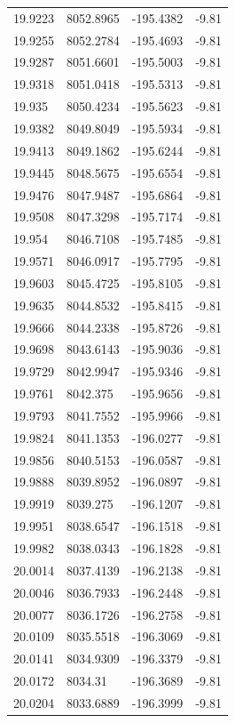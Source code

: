 \begin{table}[H]
\begin{tabular}{llll}
19.9223 & 8052.8965 & -195.4382 & -9.81 \\
19.9255 & 8052.2784 & -195.4693 & -9.81 \\
19.9287 & 8051.6601 & -195.5003 & -9.81 \\
19.9318 & 8051.0418 & -195.5313 & -9.81 \\
19.935 & 8050.4234 & -195.5623 & -9.81 \\
19.9382 & 8049.8049 & -195.5934 & -9.81 \\
19.9413 & 8049.1862 & -195.6244 & -9.81 \\
19.9445 & 8048.5675 & -195.6554 & -9.81 \\
19.9476 & 8047.9487 & -195.6864 & -9.81 \\
19.9508 & 8047.3298 & -195.7174 & -9.81 \\
19.954 & 8046.7108 & -195.7485 & -9.81 \\
19.9571 & 8046.0917 & -195.7795 & -9.81 \\
19.9603 & 8045.4725 & -195.8105 & -9.81 \\
19.9635 & 8044.8532 & -195.8415 & -9.81 \\
19.9666 & 8044.2338 & -195.8726 & -9.81 \\
19.9698 & 8043.6143 & -195.9036 & -9.81 \\
19.9729 & 8042.9947 & -195.9346 & -9.81 \\
19.9761 & 8042.375 & -195.9656 & -9.81 \\
19.9793 & 8041.7552 & -195.9966 & -9.81 \\
19.9824 & 8041.1353 & -196.0277 & -9.81 \\
19.9856 & 8040.5153 & -196.0587 & -9.81 \\
19.9888 & 8039.8952 & -196.0897 & -9.81 \\
19.9919 & 8039.275 & -196.1207 & -9.81 \\
19.9951 & 8038.6547 & -196.1518 & -9.81 \\
19.9982 & 8038.0343 & -196.1828 & -9.81 \\
20.0014 & 8037.4139 & -196.2138 & -9.81 \\
20.0046 & 8036.7933 & -196.2448 & -9.81 \\
20.0077 & 8036.1726 & -196.2758 & -9.81 \\
20.0109 & 8035.5518 & -196.3069 & -9.81 \\
20.0141 & 8034.9309 & -196.3379 & -9.81 \\
20.0172 & 8034.31 & -196.3689 & -9.81 \\
20.0204 & 8033.6889 & -196.3999 & -9.81 \\

\end{tabular}
\end{table}
